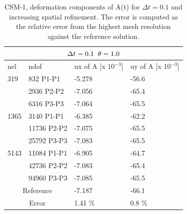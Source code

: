 \begin{table}[h!]
\centering
\begin{tabular}{ |p{1cm}||p{2.7cm}|p{3.3cm}|p{3.3cm}|}
\hline
  \multicolumn{4}{|c|}{$\Delta t = 0.1 \hspace{2mm} \theta = 1.0$} \\
\hline
nel & ndof & ux of A [x $10^{-3}$]  &uy of A [x $10^{-3}$] \\
\hline
 319     & 832 P1-P1  & -5.278 &  -56.6 \\
     & 2936 P2-P2 & -7.056 &  -65.4 \\
      & 6316 P3-P3 &  -7.064 &   -65.5  \\
 \hline
  1365    & 3140 P1-P1  & -6.385 &  -62.2 \\
     & 11736 P2-P2 & -7.075 &  -65.5 \\
     & 25792 P3-P3 & -7.083 &  -65.5 \\
 \hline
  5143    & 11084 P1-P1 & -6.905 &  -64.7  \\
     & 42736 P2-P2 & -7.083 &  -65.4\\
     & 94960 P3-P3 & -7.085 &  -65.5  \\
  \hline
  \multicolumn{2}{|c|}{Reference}  &-7.187    & -66.1 \\
   \hline
    \multicolumn{2}{|c|}{Error}  & 1.41 \%   & 0.8 \%\\
   \hline
\end{tabular}
\caption{CSM-1, deformation components of A(t) for $\Delta t = 0.1$ and increasing spatial refinement. The error is computed as the relative error from the highest mesh resolution against the reference solution.}
\label{table:csm1}
\end{table}
